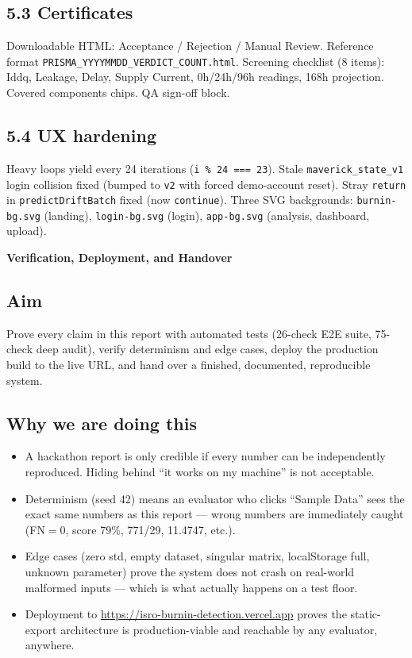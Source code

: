 \documentclass[11pt,a4paper]{article}
\newcommand{\code}[1]{\texttt{\small #1}}
\newcommand{\phasebox}[3]{\par\vspace{1em}\noindent
  \begin{tcolorbox}[colback=isroblue!6,colframe=isroblue,
    title={\sffamily\bfseries\color{white}#1 \quad [Progress: #2]},arc=2pt,boxrule=1.2pt]
    \textbf{#3}
  \end{tcolorbox}\par\vspace{0.4em}}
\begin{document}
\subsection*{5.3 Certificates}
Downloadable HTML: Acceptance / Rejection / Manual Review. Reference format
\code{PRISMA\_YYYYMMDD\_VERDICT\_COUNT.html}. Screening checklist (8 items): Iddq, Leakage,
Delay, Supply Current, 0h/24h/96h readings, 168h projection. Covered components chips. QA
sign-off block.

\subsection*{5.4 UX hardening}
Heavy loops yield every 24 iterations (\code{i \% 24 === 23}). Stale \code{maverick\_state\_v1}
login collision fixed (bumped to \code{v2} with forced demo-account reset). Stray
\code{return} in \code{predictDriftBatch} fixed (now \code{continue}). Three SVG backgrounds:
\code{burnin-bg.svg} (landing), \code{login-bg.svg} (login), \code{app-bg.svg} (analysis,
dashboard, upload).

\phasebox{Phase 6}{90\% -- 100\%}{Verification, Deployment, and Handover}

\subsection*{Aim}
Prove every claim in this report with automated tests (26-check E2E suite, 75-check deep audit),
verify determinism and edge cases, deploy the production build to the live URL, and hand over a
finished, documented, reproducible system.

\subsection*{Why we are doing this}
\begin{itemize}[leftmargin=1.5em]
  \item A hackathon report is only credible if every number can be independently reproduced.
        Hiding behind ``it works on my machine'' is not acceptable.
  \item Determinism (seed 42) means an evaluator who clicks ``Sample Data'' sees the exact same
        numbers as this report --- wrong numbers are immediately caught (FN$=$0, score 79\%,
        771/29, 11.4747, etc.).
  \item Edge cases (zero std, empty dataset, singular matrix, localStorage full, unknown
        parameter) prove the system does not crash on real-world malformed inputs --- which is
        what actually happens on a test floor.
  \item Deployment to \url{https://isro-burnin-detection.vercel.app} proves the static-export
        architecture is production-viable and reachable by any evaluator, anywhere.
\end{itemize}
\end{document}
